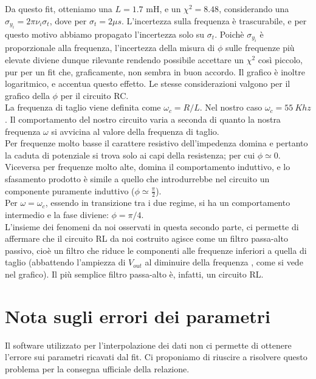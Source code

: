 Da questo fit, otteniamo una $L=1.7$ mH, e un $\chi^2 = 8.48 $, considerando una $\sigma_{y_i} = 2 \pi \nu_i \sigma_{t}$, dove  per $\sigma_t = 2 \mu s$. L'incertezza sulla frequenza è trascurabile, e per questo motivo abbiamo propagato l'incertezza solo su $\sigma_t$. Poichè $\sigma_{y_i}$ è proporzionale alla frequenza, l'incertezza della misura di $\phi$ sulle frequenze più elevate diviene dunque rilevante rendendo possibile accettare un $\chi^2$ così piccolo, pur per un fit che, graficamente, non sembra in buon accordo. Il grafico è inoltre logaritmico, e accentua questo effetto. Le stesse considerazioni valgono per il grafico della $\phi$ per il circuito RC.
\\

La frequenza di taglio viene definita come $\omega_c = R/L$. Nel nostro caso $\omega_c = 55\ Khz$. Il comportamento del nostro circuito varia a seconda di quanto la nostra frequenza $\omega$ si avvicina al valore della frequenza di taglio. \\
Per frequenze molto basse il carattere resistivo dell'impedenza domina e pertanto la caduta di potenziale si trova solo ai capi della resistenza; per cui $ \phi \simeq 0$. Viceversa per frequenze molto alte, domina il comportamento induttivo, e lo sfasamento prodotto è simile a quello che introdurrebbe nel circuito un componente puramente induttivo ($\phi \simeq \frac{\pi}{2}$).  \\
Per $\omega = \omega_c$, essendo in transizione tra i due regime, si ha un comportamento intermedio e la fase diviene: $ \phi = \pi/4$. \\

L'insieme dei fenomeni da noi osservati in questa secondo parte, ci permette di affermare che il circuito RL da noi costruito agisce come un filtro passa-alto passivo, cioè un filtro che riduce le componenti alle frequenze inferiori a quella di taglio (abbattendo l'ampiezza di $V_{out}$ al diminuire della frequenza , come si vede nel grafico). Il più semplice filtro passa-alto è, infatti, un circuito RL. 


\section{Nota sugli errori dei parametri}
Il software utilizzato per l'interpolazione dei dati non ci permette di ottenere l'errore sui parametri ricavati dal fit. Ci proponiamo di riuscire a risolvere questo problema per la consegna ufficiale della relazione.
